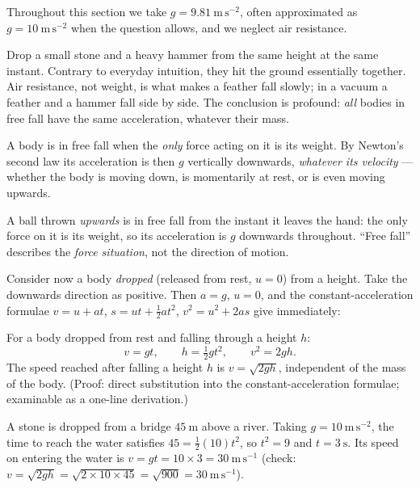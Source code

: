 \documentclass[11pt]{article}
\newcommand{\cle}[1]{{\popxbold\color{popdark}#1}}
\newcounter{popsec}
\newcounter{popsub}
\newcommand{\courssub}[1]{%
  \stepcounter{popsub}%
  \par\vspace{9pt}\noindent{\popxbold\fontsize{11.5}{13}\selectfont\color{popink}{\color{poporange}\thepopsec.\thepopsub}\hspace{6pt}#1}\par\nopagebreak\vspace{4pt}
}
\begin{document}
Throughout this section we take $g = 9.81\ \mathrm{m\,s^{-2}}$, often approximated as $g = 10\ \mathrm{m\,s^{-2}}$ when the question allows, and we neglect air resistance.

\courssub{Free Fall: Dropped from Rest}

\begin{experience}
Drop a small stone and a heavy hammer from the same height at the same instant. Contrary to everyday intuition, they hit the ground essentially together. Air resistance, not weight, is what makes a feather fall slowly; in a vacuum a feather and a hammer fall side by side. The conclusion is profound: \emph{all} bodies in free fall have the same acceleration, whatever their mass.
\end{experience}

\begin{definition}
A body is in \cle{free fall} when the \emph{only} force acting on it is its \cle{weight}. By Newton's second law its acceleration is then $g$ vertically downwards, \emph{whatever its velocity} — whether the body is moving down, is momentarily at rest, or is even moving upwards.
\end{definition}

\begin{attention}
A ball thrown \emph{upwards} is in free fall from the instant it leaves the hand: the only force on it is its weight, so its acceleration is $g$ downwards throughout. ``Free fall'' describes the \emph{force situation}, not the direction of motion.
\end{attention}

Consider now a body \emph{dropped} (released from rest, $u = 0$) from a height. Take the \cle{downwards} direction as positive. Then $a = g$, $u = 0$, and the constant-acceleration formulae $v = u + at$, $s = ut + \tfrac12 at^2$, $v^2 = u^2 + 2as$ give immediately:

\begin{propriete}
For a body dropped from rest and falling through a height $h$:
\[ v = gt, \qquad h = \tfrac{1}{2}gt^{2}, \qquad v^{2} = 2gh. \]
The speed reached after falling a height $h$ is $v = \sqrt{2gh}$, independent of the mass of the body. (Proof: direct substitution into the constant-acceleration formulae; examinable as a one-line derivation.)
\end{propriete}

\begin{exemplebox}
A stone is dropped from a bridge $45\ \mathrm{m}$ above a river. Taking $g = 10\ \mathrm{m\,s^{-2}}$, the time to reach the water satisfies $45 = \tfrac12(10)t^2$, so $t^2 = 9$ and $t = 3\ \mathrm{s}$. Its speed on entering the water is $v = gt = 10 \times 3 = 30\ \mathrm{m\,s^{-1}}$ (check: $v = \sqrt{2gh} = \sqrt{2 \times 10 \times 45} = \sqrt{900} = 30\ \mathrm{m\,s^{-1}}$).
\end{exemplebox}
\end{document}
